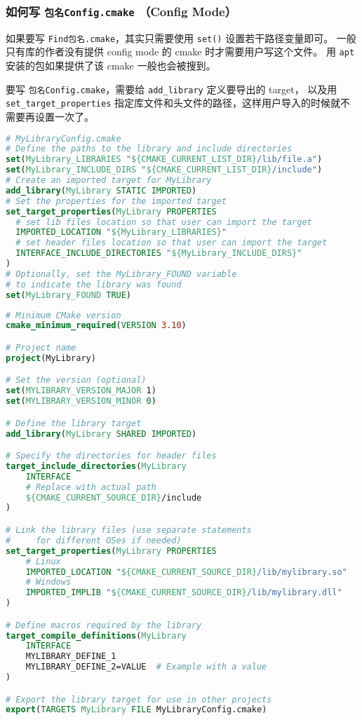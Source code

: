 \subsubsection{如何写 \verb`包名Config.cmake` （Config Mode）}
如果要写 \verb`Find包名.cmake`，其实只需要使用 \verb`set()` 设置若干路径变量即可。 一般只有库的作者没有提供 config mode 的 cmake 时才需要用户写这个文件。 用 \verb`apt` 安装的包如果提供了该 cmake 一般也会被搜到。

要写 \verb`包名Config.cmake`，需要给 \verb`add_library` 定义要导出的 target， 以及用 \verb`set_target_properties` 指定库文件和头文件的路径，这样用户导入的时候就不需要再设置一次了。
\begin{lstlisting}[language=cmake]
# MyLibraryConfig.cmake
# Define the paths to the library and include directories
set(MyLibrary_LIBRARIES "${CMAKE_CURRENT_LIST_DIR}/lib/file.a")
set(MyLibrary_INCLUDE_DIRS "${CMAKE_CURRENT_LIST_DIR}/include")
# Create an imported target for MyLibrary
add_library(MyLibrary STATIC IMPORTED)
# Set the properties for the imported target
set_target_properties(MyLibrary PROPERTIES
  # set lib files location so that user can import the target
  IMPORTED_LOCATION "${MyLibrary_LIBRARIES}"
  # set header files location so that user can import the target
  INTERFACE_INCLUDE_DIRECTORIES "${MyLibrary_INCLUDE_DIRS}"
)
# Optionally, set the MyLibrary_FOUND variable
# to indicate the library was found
set(MyLibrary_FOUND TRUE)
\end{lstlisting}

\begin{lstlisting}[language=cmake]
# Minimum CMake version
cmake_minimum_required(VERSION 3.10)

# Project name
project(MyLibrary)

# Set the version (optional)
set(MYLIBRARY_VERSION_MAJOR 1)
set(MYLIBRARY_VERSION_MINOR 0)

# Define the library target
add_library(MyLibrary SHARED IMPORTED)

# Specify the directories for header files
target_include_directories(MyLibrary
    INTERFACE
    # Replace with actual path
    ${CMAKE_CURRENT_SOURCE_DIR}/include
)

# Link the library files (use separate statements
#     for different OSes if needed)
set_target_properties(MyLibrary PROPERTIES
    # Linux
    IMPORTED_LOCATION "${CMAKE_CURRENT_SOURCE_DIR}/lib/mylibrary.so"
    # Windows
    IMPORTED_IMPLIB "${CMAKE_CURRENT_SOURCE_DIR}/lib/mylibrary.dll"
)

# Define macros required by the library
target_compile_definitions(MyLibrary
    INTERFACE
    MYLIBRARY_DEFINE_1
    MYLIBRARY_DEFINE_2=VALUE  # Example with a value
)

# Export the library target for use in other projects
export(TARGETS MyLibrary FILE MyLibraryConfig.cmake)
\end{lstlisting}

